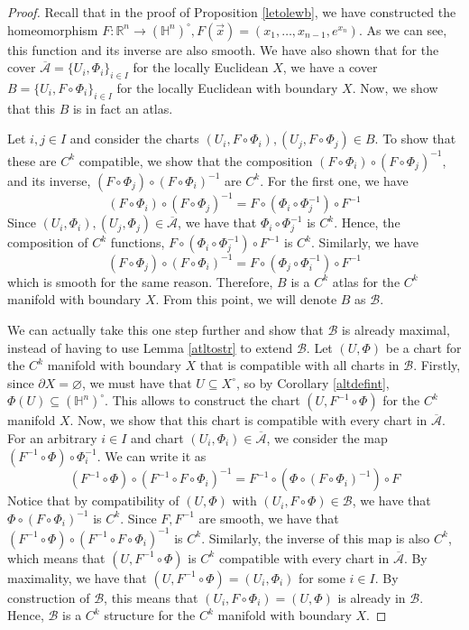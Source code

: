 \documentclass{article}
\newcommand{\R}{\mathbb{R}}
\renewcommand{\H}{\mathbb{H}}
\newcommand{\cl}[1]{\overline{#1}}
\newcommand{\bdr}{\partial}
\newcommand{\atl}[1]{\mathcal{#1}}
\newcommand{\str}[1]{\cl{\atl{#1}}}
\theoremstyle{plain} %
\numberwithin{thm}{section} %
\theoremstyle{definition} %
\begin{document}
\begin{proof}
Recall that in the proof of Proposition \ref{letolewb}, we have constructed the homeomorphism $F: \R^n \to (\H^n)^\circ, F(\vec{x}) = (x_1, \dots, x_{n - 1}, e^{x_n})$. As we can see, this function and its inverse are also smooth. We have also shown that for the cover $\str{A} = \{U_i, \Phi_i\}_{i \in I}$ for the locally Euclidean $X$, we have a cover $B = \{U_i, F \circ \Phi_i\}_{i \in I}$ for the locally Euclidean with boundary $X$. Now, we show that this $B$ is in fact an atlas.

Let $i,j \in I$ and consider the charts $(U_i, F \circ \Phi_i), (U_j, F \circ \Phi_j) \in B$. To show that these are $C^k$ compatible, we show that the composition $(F \circ \Phi_i) \circ (F \circ \Phi_j)^{-1}$, and its inverse, $(F \circ \Phi_j) \circ (F \circ \Phi_i)^{-1}$ are $C^k$. For the first one, we have
\[
    (F \circ \Phi_i) \circ (F \circ \Phi_j)^{-1} = F \circ (\Phi_i \circ \Phi_j^{-1}) \circ F^{-1}
\]
Since $(U_i, \Phi_i), (U_j, \Phi_j) \in \str{A}$, we have that $\Phi_i \circ \Phi_j^{-1}$ is $C^k$. Hence, the composition of $C^k$ functions, $F \circ (\Phi_i \circ \Phi_j^{-1}) \circ F^{-1}$ is $C^k$. Similarly, we have
\[
    (F \circ \Phi_j) \circ (F \circ \Phi_i)^{-1} = F \circ (\Phi_j \circ \Phi_i^{-1}) \circ F^{-1}
\]
which is smooth for the same reason. Therefore, $B$ is a $C^k$ atlas for the $C^k$ manifold with boundary $X$. From this point, we will denote $B$ as $\atl{B}$.

We can actually take this one step further and show that $\atl{B}$ is already maximal, instead of having to use Lemma \ref{atltostr} to extend $\atl{B}$. Let $(U, \Phi)$ be a chart for the $C^k$ manifold with boundary $X$ that is compatible with all charts in $\atl{B}$. Firstly, since $\bdr X = \varnothing$, we must have that $U \subseteq X^\circ$, so by Corollary \ref{altdefint}, $\Phi(U) \subseteq (\H^n)^\circ$. This allows to construct the chart $(U, F^{-1} \circ \Phi)$ for the $C^k$ manifold $X$. Now, we show that this chart is compatible with every chart in $\str{A}$. For an arbitrary $i \in I$ and chart $(U_i, \Phi_i) \in \str{A}$, we consider the map $(F^{-1} \circ \Phi) \circ \Phi_i^{-1}$. We can write it as
\[
    (F^{-1} \circ \Phi) \circ (F^{-1} \circ F \circ \Phi_i)^{-1} = F^{-1} \circ (\Phi \circ (F \circ \Phi_i)^{-1}) \circ F
\]
Notice that by compatibility of $(U, \Phi)$ with $(U_i, F \circ \Phi) \in \atl{B}$, we have that $\Phi \circ (F \circ \Phi_i)^{-1}$ is $C^k$. Since $F, F^{-1}$ are smooth, we have that $(F^{-1} \circ \Phi) \circ (F^{-1} \circ F \circ \Phi_i)^{-1}$ is $C^k$. Similarly, the inverse of this map is also $C^k$, which means that $(U, F^{-1} \circ \Phi)$ is $C^k$ compatible with every chart in $\str{A}$. By maximality, we have that $(U, F^{-1} \circ \Phi) = (U_i, \Phi_i)$ for some $i \in I$. By construction of $\atl{B}$, this means that $(U_i, F \circ \Phi_i) = (U, \Phi)$ is already in $\atl{B}$. Hence, $\atl{B}$ is a $C^k$ structure for the $C^k$ manifold with boundary $X$.
\end{proof}
\end{document}
